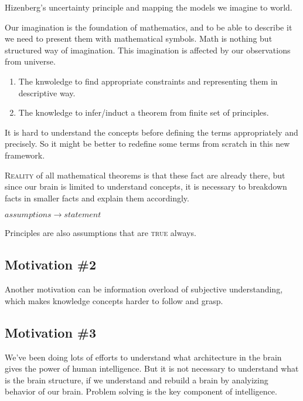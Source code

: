 \documentclass{article}
\begin{document}
Hizenberg's uncertainty principle and mapping the models we imagine to world.

Our imagination is the foundation of mathematics, and to be able to describe it we need to present them with mathematical symbols. Math is nothing but structured way of imagination. This imagination is affected by our observations from universe.


\begin{enumerate}
\item The knwoledge to find appropriate constraints and representing them in descriptive way.
\item The knowledge to infer/induct a theorem from finite set of principles.
\end{enumerate}


It is hard to understand the concepts before defining the terms appropriately and precisely. So it might be better to redefine some terms from scratch in this new framework.


\textsc{Reality} of all mathematical theorems is that these fact are already there, but since our brain is limited to understand concepts, it is necessary to breakdown facts in smaller facts and explain them accordingly.





\begin{center}\(assumptions \rightarrow statement\)\end{center}

Principles are also assumptions that are \textsc{true} always.



\subsection{Motivation \#2} 

Another motivation can be information overload of subjective understanding, which makes knowledge concepts harder to follow and grasp.



\subsection{Motivation \#3} 

We've been doing lots of efforts to understand what architecture in the brain gives the power of human intelligence. But it is not necessary to understand what is the brain structure, if we understand and rebuild a brain by analyizing behavior of our brain. Problem solving is the key component of intelligence. 
\end{document}

